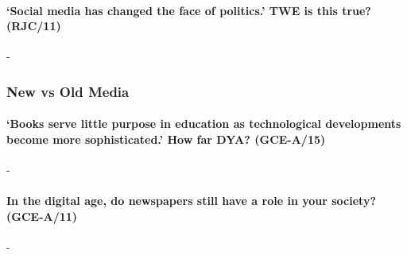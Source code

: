 \documentclass[../../main]{subfiles}
\begin{document}
\paragraph{`Social media has changed the face of politics.' TWE is this true? (RJC/11)}-


\subsubsection{New vs Old Media}

\paragraph{`Books serve little purpose in education as technological developments become more sophisticated.' How far DYA? (GCE-A/15)}-

\paragraph{In the digital age, do newspapers still have a role in your society? (GCE-A/11)}-
\end{document}
